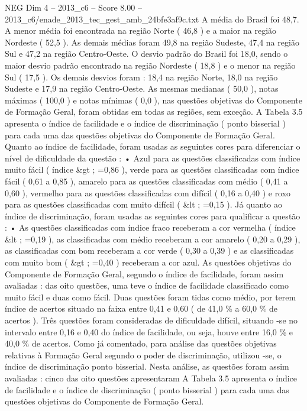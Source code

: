 \begin{textsample}{NEG Dim 4 – 2013\_c6 – Score 8.00 – 2013\_c6/enade\_2013\_tec\_gest\_amb\_24bfe3af9c.txt}
A média do Brasil foi 48,7.
A menor média foi encontrada na região Norte ( 46,8 ) e a maior na região Nordeste ( 52,5 ).
As demais médias foram 49,8 na região Sudeste, 47,4 na região Sul e 47,2 na região Centro-Oeste.
O desvio padrão do Brasil foi 18,0, sendo o maior desvio padrão encontrado na região Nordeste ( 18,8 ) e o menor na região Sul ( 17,5 ).
Os demais desvios foram : 18,4 na região Norte, 18,0 na região Sudeste e 17,9 na região Centro-Oeste.
As mesmas medianas ( 50,0 ), notas máximas ( 100,0 ) e notas mínimas ( 0,0 ), nas questões objetivas do Componente de Formação Geral, foram obtidas em todas as regiões, sem exceção.
A Tabela 3.5 apresenta o índice de facilidade e o índice de discriminação ( ponto bisserial ) para cada uma das questões objetivas do Componente de Formação Geral.
Quanto ao índice de facilidade, foram usadas as seguintes cores para diferenciar o nível de dificuldade da questão : • Azul para as questões classificadas com índice muito fácil ( índice \&gt ; =0,86 ), verde para as questões classificadas com índice fácil ( 0,61 a 0,85 ), amarelo para as questões classificadas com médio ( 0,41 a 0,60 ), vermelho para as questões classificadas com difícil ( 0,16 a 0,40 ) e roxo para as questões classificadas com muito difícil ( \&lt ; =0,15 ).
Já quanto ao índice de discriminação, foram usadas as seguintes cores para qualificar a questão : • As questões classificadas com índice fraco receberam a cor vermelha ( índice \&lt ; =0,19 ), as classificadas com médio receberam a cor amarelo ( 0,20 a 0,29 ), as classificadas com bom receberam a cor verde ( 0,30 a 0,39 ) e as classificadas com muito bom ( \&gt ; =0,40 ) receberam a cor azul.
As questões objetivas do Componente de Formação Geral, segundo o índice de facilidade, foram assim avaliadas : das oito questões, uma teve o índice de facilidade classificado como muito fácil e duas como fácil.
Duas questões foram tidas como médio, por terem índice de acertos situado na faixa entre 0,41 e 0,60 ( de 41,0 \% a 60,0 \% de acertos ).
Três questões foram consideradas de dificuldade difícil, situando -se no intervalo entre 0,16 e 0,40 do índice de facilidade, ou seja, houve entre 16,0 \% e 40,0 \% de acertos.
Como já comentado, para análise das questões objetivas relativas à Formação Geral segundo o poder de discriminação, utilizou -se, o índice de discriminação ponto bisserial.
Nesta análise, as questões foram assim avaliadas : cinco das oito questões apresentaram A Tabela 3.5 apresenta o índice de facilidade e o índice de discriminação ( ponto bisserial ) para cada uma das questões objetivas do Componente de Formação Geral.

\end{textsample}
